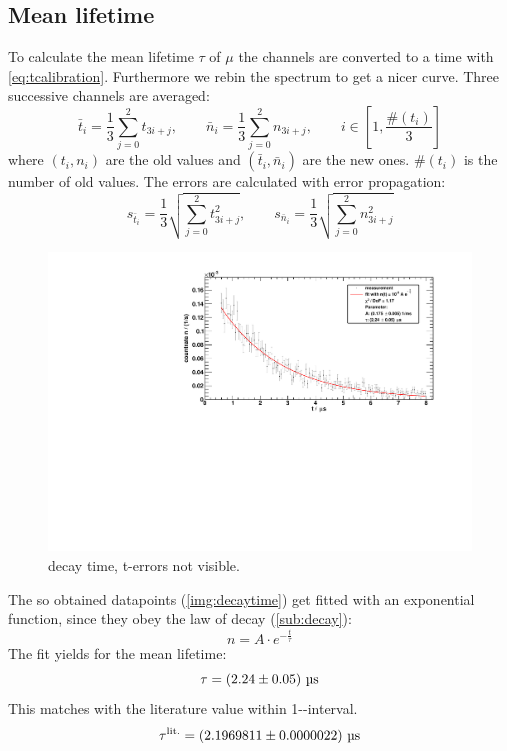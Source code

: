 \subsection{Mean lifetime}
To calculate the mean lifetime $\tau$ of $\mu$ the channels are converted to a time with \autoref{eq:tcalibration}. 
Furthermore we rebin the spectrum to get a nicer curve. Three successive channels are averaged:
\begin{equation}
    \bar{t}_i = \frac{1}{3} \sum_{j=0}^{2} t_{3i+j}, \qquad \bar{n}_i = \frac{1}{3} \sum_{j=0}^{2} n_{3i+j}, \qquad i \in \left[1, \frac{\#(t_i)}{3} \right]
\end{equation}
where $(t_i, n_i)$ are the old values and $(\bar{t}_i, \bar{n}_i)$ are the new ones. $\#(t_i)$ is the number of old values.
The errors are calculated with error propagation:
\begin{equation}
    s_{\bar{t}_i} = \frac{1}{3} \sqrt{\sum_{j=0}^{2} t_{3i+j}^2}, \qquad s_{\bar{n}_i} = \frac{1}{3} \sqrt{\sum_{j=0}^{2} n_{3i+j}^2}
\end{equation}
\begin{figure}[H]
\begin{center}
  \includegraphics[width=\textwidth]{../img/decayTime.pdf}
  \caption{decay time, t-errors not visible.}
  \label{img:decaytime}
\end{center}
\end{figure}

The so obtained datapoints (\autoref{img:decaytime}) get fitted with an exponential function, since they obey the law of decay (\ref{sub:decay}):
\begin{equation}
    n = A \cdot e^{-\frac{t}{\tau}}
\end{equation}
The fit yields for the mean lifetime:
\begin{equation}
    \tau = \left( 2.24 \pm 0.05 \right)\,\text{\textmu s}
\end{equation}
This matches with the literature value within 1-\textsigma-interval. %
\begin{equation}
    \tau^{\text{lit.}} = \left( 2.1969811 \pm 0.0000022 \right)\,\text{\textmu s}
\end{equation}

